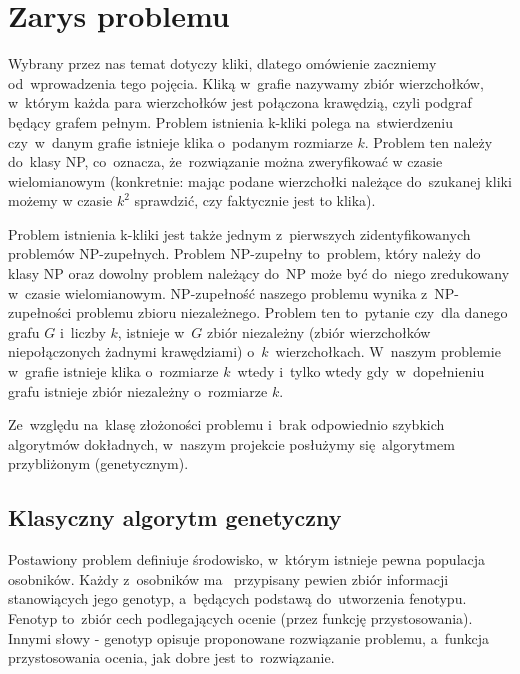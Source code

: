 \documentclass[11pt]{aghdpl}
\author{Wojciech Kasperek, Krzysztof Spytkowski, Izabela Śmietana}
\date{2014}
\begin{document}
\titlepages

\tableofcontents
\clearpage

\chapter{Zarys problemu}
\label{cha:zarys}


Wybrany przez nas temat dotyczy kliki, dlatego omówienie zaczniemy od~wprowadzenia tego pojęcia. 
Kliką w~grafie nazywamy zbiór wierzchołków, w~którym każda para wierzchołków jest połączona krawędzią, 
czyli podgraf będący grafem pełnym. Problem istnienia k-kliki polega na~stwierdzeniu 
czy~w~danym grafie istnieje klika o~podanym rozmiarze $k$. Problem ten należy do~klasy NP, co~oznacza, że~rozwiązanie 
można zweryfikować w czasie wielomianowym (konkretnie: mając podane wierzchołki należące do~szukanej
kliki możemy w czasie $k^2$ sprawdzić, czy faktycznie jest to klika).

Problem istnienia k-kliki jest także jednym z~pierwszych zidentyfikowanych problemów NP-zupełnych. 
Problem NP-zupełny to~problem, który należy do klasy NP oraz dowolny problem należący do~NP może być do~niego 
zredukowany w~czasie wielomianowym. NP-zupełność naszego problemu wynika z~NP-zupełności problemu 
zbioru niezależnego. Problem ten to~pytanie czy~dla danego grafu $G$ i~liczby $k$, istnieje w~$G$ zbiór 
niezależny (zbiór wierzchołków niepołączonych żadnymi krawędziami) o~$k$~wierzchołkach. W~naszym problemie 
w~grafie istnieje klika o~rozmiarze $k$~wtedy i~tylko wtedy gdy~w~dopełnieniu grafu istnieje zbiór niezależny 
o~rozmiarze $k$.

Ze~względu na~klasę złożoności problemu i~brak odpowiednio szybkich algorytmów dokładnych, w~naszym projekcie 
posłużymy się~algorytmem przybliżonym (genetycznym). 

\section{Klasyczny algorytm genetyczny}
\label{sec:algGenetyczne}
Postawiony problem definiuje środowisko, w~którym istnieje pewna populacja osobników. Każdy z~osobników ma~
przypisany pewien zbiór informacji stanowiących jego genotyp, a~będących podstawą do~utworzenia
fenotypu. Fenotyp to~zbiór cech podlegających ocenie (przez funkcję przystosowania).
Innymi słowy - genotyp opisuje proponowane rozwiązanie problemu, a~funkcja przystosowania ocenia, jak
dobre jest to~rozwiązanie.
\end{document}

